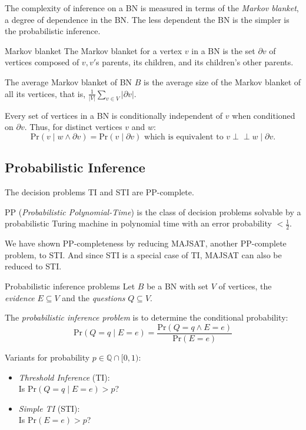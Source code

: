\documentclass[english]{panikzettel}
\renewcommand{\Pr}{\mathrm{Pr}}
\newcommand{\rat}{\mathbb{Q}}
\begin{document}
The complexity of inference on a BN is measured in terms of the \emph{Markov blanket}, a degree of dependence in the BN.
The less dependent the BN is the simpler is the probabilistic inference.

\begin{defi}{Markov blanket}
	The Markov blanket for a vertex $v$ in a BN is the set $\partial v$ of vertices composed of $v, v'$s parents, its children, and its children's other parents.

	The average Markov blanket of BN $B$ is the average size of the Markov blanket of all its vertices, that is, $\frac{1}{|V|}\sum_{v \in V} |\partial v|$.
\end{defi}

Every set of vertices in a BN is conditionally independent of $v$ when conditioned on $\partial v$. Thus, for distinct vertices $v$ and $w$:
$$\Pr(v \mid w \land \partial v) = \Pr(v \mid \partial v) \text{ which is equivalent to } v \perp\!\!\!\!\perp w \mid \partial v.$$

\subsection{Probabilistic Inference}

\begin{halfboxl}
	The decision problems TI and STI are PP-complete.

	PP (\emph{Probabilistic Polynomial-Time}) is the class of decision problems solvable by a probabilistic Turing machine in polynomial time with an error probability $< \frac{1}{2}$.

	We have shown PP-completeness by reducing MAJSAT, another PP-complete problem, to STI.
	And since STI is a special case of TI, MAJSAT can also be reduced to STI.
\end{halfboxl}%
\begin{halfboxr}
	\vspace{-\baselineskip}
	\begin{defi}{Probabilistic inference problems}
		Let $B$ be a BN with set $V$ of vertices, the \emph{evidence} $E \subseteq V$ and the \emph{questions} $Q \subseteq V$.

		The \emph{probabilistic inference problem} is to determine the conditional probability:
		$$\Pr(Q=q \mid E=e)=\frac{\Pr(Q=q \land E=e)}{\Pr(E=e)}$$

		Variants for probability $p \in \rat \cap [0,1)$:
		\begin{itemize}
			\item \emph{Threshold Inference} (TI): \\
			      Is $\Pr(Q=q \mid E=e) > p$?
			\item \emph{Simple TI} (STI): \\
			      Is $\Pr(E=e) > p$?
		\end{itemize}
	\end{defi}
\end{halfboxr}
\end{document}
